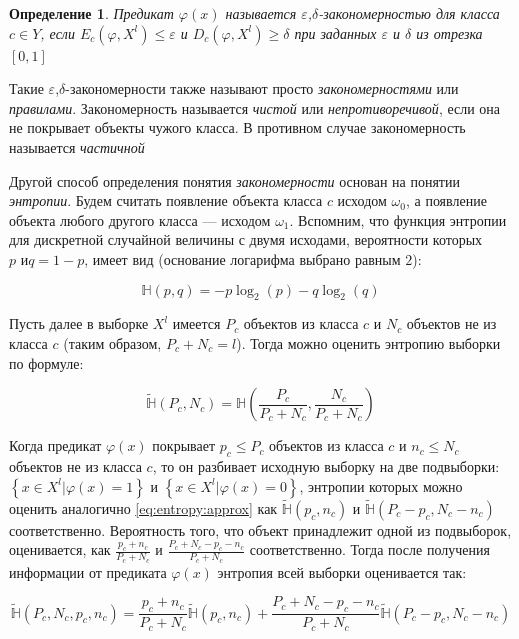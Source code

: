 \documentclass[12pt]{article}
\newtheorem{definition}{Определение}
\begin{document}
\begin{definition}
  Предикат \(\varphi(x)\) называется
  \emph{\(\varepsilon\),\(\delta\)-закономерностью} для класса \(c \in
  Y\), если \(E_c(\varphi, X^l) \leqslant \varepsilon \) и \(D_c(\varphi,
  X^l)\geqslant\delta\) при заданных \(\varepsilon\) и \(\delta\) из
  отрезка \([0, 1]\)
\end{definition}

Такие \(\varepsilon\),\(\delta\)-закономерности также называют просто
\emph{закономерностями} или \emph{правилами}. Закономерность
называется \emph{чистой} или \emph{непротиворечивой}, если она не
покрывает объекты чужого класса. В противном случае закономерность
называется \emph{частичной}

Другой способ определения понятия \emph{закономерности} основан на
понятии \emph{энтропии}. Будем считать появление объекта класса \(c\)
исходом \(\omega_0\), а появление объекта любого другого класса ---
исходом \(\omega_1\). Вспомним, что функция энтропии для дискретной
случайной величины с двумя исходами, вероятности которых \(p \text{ и
} q = 1 - p\), имеет вид (основание логарифма выбрано равным \(2\)):

\[\mathbb{H}(p, q) = -p\log_2(p)-q\log_2(q)\]

Пусть далее в выборке \(X^l\) имеется \(P_c\) объектов из класса \(c\)
и \(N_c\) объектов не из класса \(c\) (таким образом, \(P_c + N_c =
l\)). Тогда можно оценить энтропию выборки по формуле:

\begin{equation}\label{eq:entropy:approx}
\tilde{\mathbb{H}}(P_c, N_c) =
\mathbb{H}\left(\frac{P_c}{P_c+N_c},\frac{N_c}{P_c+N_c}\right)
\end{equation}

Когда предикат \(\varphi(x)\) покрывает \(p_c\leqslant P_c\) объектов из
класса \(c\) и \(n_c\leqslant N_c\) объектов не из класса \(c\), то он
разбивает исходную выборку на две подвыборки: \(\left\{x\in X^l |
\varphi(x) = 1\right\}\) и \(\left\{x\in X^l | \varphi(x) =
0\right\}\), энтропии которых можно оценить аналогично
\ref{eq:entropy:approx} как \(\tilde{\mathbb{H}}(p_c, n_c)\) и
\(\tilde{\mathbb{H}}(P_c - p_c, N_c - n_c)\)
соответственно. Вероятность того, что объект принадлежит одной из
подвыборок, оценивается, как \(\frac{p_c + n_c}{P_c + N_c}\) и
\(\frac{P_c + N_c - p_c - n_c}{P_c + N_c}\) соответственно. Тогда
после получения информации от предиката \(\varphi(x)\) энтропия всей
выборки оценивается так:

\[
\tilde{\mathbb{H}}(P_c, N_c, p_c, n_c) =
\frac{p_c + n_c}{P_c + N_c}\tilde{\mathbb{H}}(p_c, n_c) +
\frac{P_c+N_c-p_c-n_c}{P_c+N_c}\tilde{\mathbb{H}}(P_c - p_c, N_c - n_c)
\]
\end{document}
